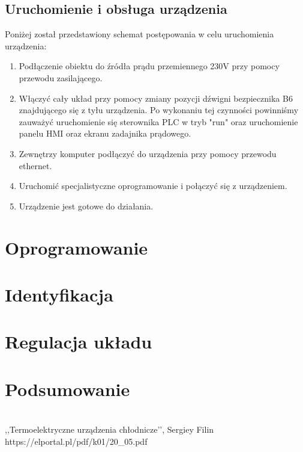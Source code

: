 \documentclass[oneside]{mgr}
\begin{document}
\section{Uruchomienie i obsługa urządzenia}
Poniżej został przedstawiony schemat postępowania w celu uruchomienia urządzenia:
\begin{enumerate}
    \item Podłączenie obiektu do źródła prądu przemiennego 230V przy pomocy przewodu zasilającego.
    \item Włączyć cały układ przy pomocy zmiany pozycji dźwigni bezpiecznika B6 znajdującego się z tyłu urządzenia. Po wykonaniu tej czynności powinniśmy zauważyć uruchomienie się sterownika PLC w tryb "run" oraz uruchomienie panelu HMI oraz ekranu zadajnika prądowego.
    \item Zewnętrzy komputer podłączyć do urządzenia przy pomocy przewodu ethernet.
    \item Uruchomić specjalistyczne oprogramowanie i połączyć się z urządzeniem.
    \item Urządzenie jest gotowe do działania.
\end{enumerate}
\chapter{Oprogramowanie}

\chapter{Identyfikacja}
\chapter{Regulacja układu}
\chapter{Podsumowanie}



\begin{thebibliography} 
\\
,,Termoelektryczne urządzenia chłodnicze’’, Sergiey Filin
 https://elportal.pl/pdf/k01/20\_05.pdf
\end{thebibliography}

\end{document}

